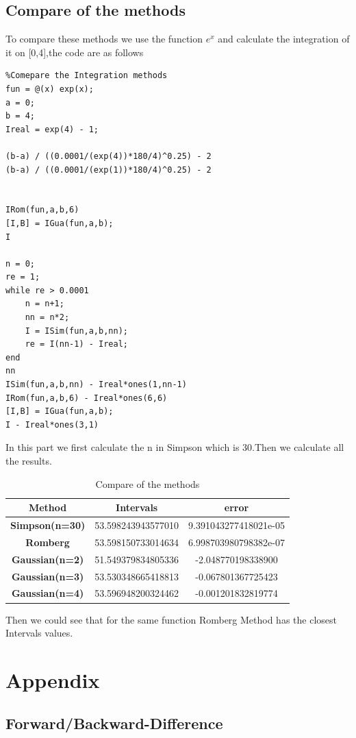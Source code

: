 \documentclass{article}
\begin{document}
\subsection{Compare of the methods}
To compare these methods we use the function $e^x$ and calculate the integration of it on [0,4],the code are as follows
\begin{lstlisting}
%Comepare the Integration methods
fun = @(x) exp(x);
a = 0;
b = 4;
Ireal = exp(4) - 1;

(b-a) / ((0.0001/(exp(4))*180/4)^0.25) - 2
(b-a) / ((0.0001/(exp(1))*180/4)^0.25) - 2


IRom(fun,a,b,6)
[I,B] = IGua(fun,a,b);
I

n = 0;
re = 1;
while re > 0.0001
    n = n+1;
    nn = n*2;
    I = ISim(fun,a,b,nn);
    re = I(nn-1) - Ireal;
end
nn
ISim(fun,a,b,nn) - Ireal*ones(1,nn-1)
IRom(fun,a,b,6) - Ireal*ones(6,6)
[I,B] = IGua(fun,a,b);
I - Ireal*ones(3,1)
\end{lstlisting}
In this part we first calculate the n in Simpson which is 30.Then we calculate all the results.
\begin{table}[!ht]
    \centering
    \begin{tabular}{|c|c|c|}
    \hline
        \textbf{Method} & \textbf{Intervals} & \textbf{error} \\ \hline
        \textbf{Simpson(n=30)} &   53.598243943577010  &      9.391043277418021e-05  \\ \hline
        \textbf{Romberg} &   53.598150733014634  &      6.998703980798382e-07  \\ \hline
        \textbf{Gaussian(n=2)} &   51.549379834805336  &   -2.048770198338900  \\ \hline
        \textbf{Gaussian(n=3)} &   53.530348665418813  &   -0.067801367725423  \\ \hline
        \textbf{Gaussian(n=4)} &   53.596948200324462  &   -0.001201832819774  \\ \hline
    \end{tabular}
    \caption{Compare of the methods}
    \label{COM2}
\end{table}
Then we could see that for the same function Romberg Method has the closest Intervals values.
\newpage
\section*{Appendix}
\subsection*{Forward/Backward-Difference}

\end{document}
